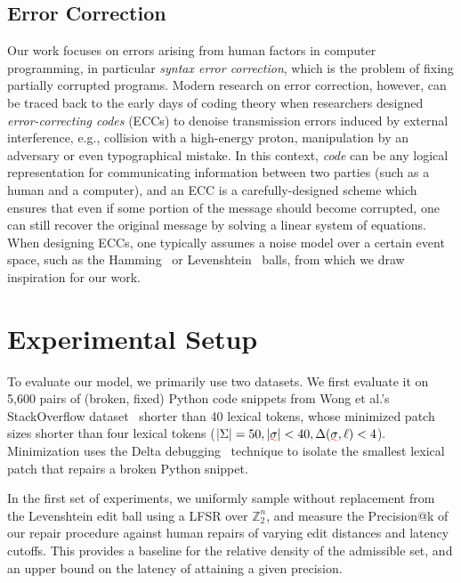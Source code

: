 \documentclass[sigplan,review,anonymous,acmsmall]{acmart}\settopmatter{printfolios=false,printccs=false,printacmref=false}
\begin{document}
\subsection{Error Correction}

Our work focuses on errors arising from human factors in computer programming, in particular \textit{syntax error correction}, which is the problem of fixing partially corrupted programs. Modern research on error correction, however, can be traced back to the early days of coding theory when researchers designed \textit{error-correcting codes} (ECCs) to denoise transmission errors induced by external interference, e.g., collision with a high-energy proton, manipulation by an adversary or even typographical mistake. In this context, \textit{code} can be any logical representation for communicating information between two parties (such as a human and a computer), and an ECC is a carefully-designed scheme which ensures that even if some portion of the message should become corrupted, one can still recover the original message by solving a linear system of equations. When designing ECCs, one typically assumes a noise model over a certain event space, such as the Hamming~\cite{titsias2017hamming, dong2023number} or Levenshtein~\cite{becerra2008learning, barlev2021levenshtein} balls, from which we draw inspiration for our work.

\section{Experimental Setup}\label{sec:experiments}

To evaluate our model, we primarily use two datasets. We first evaluate it on 5,600 pairs of (broken, fixed) Python code snippets from Wong et al.'s StackOverflow dataset~\cite{wong2019syntax} shorter than 40 lexical tokens, whose minimized patch sizes shorter than four lexical tokens ($|\Sigma| = 50, |\err{\sigma}| < 40, \Delta(\err{\sigma}, \ell) < 4$). Minimization uses the Delta debugging~\cite{zeller2002isolating} technique to isolate the smallest lexical patch that repairs a broken Python snippet.

In the first set of experiments, we uniformly sample without replacement from the Levenshtein edit ball using a LFSR over $\mathbb{Z}_2^n$, and measure the Precision@k of our repair procedure against human repairs of varying edit distances and latency cutoffs. This provides a baseline for the relative density of the admissible set, and an upper bound on the latency of attaining a given precision.
\end{document}

